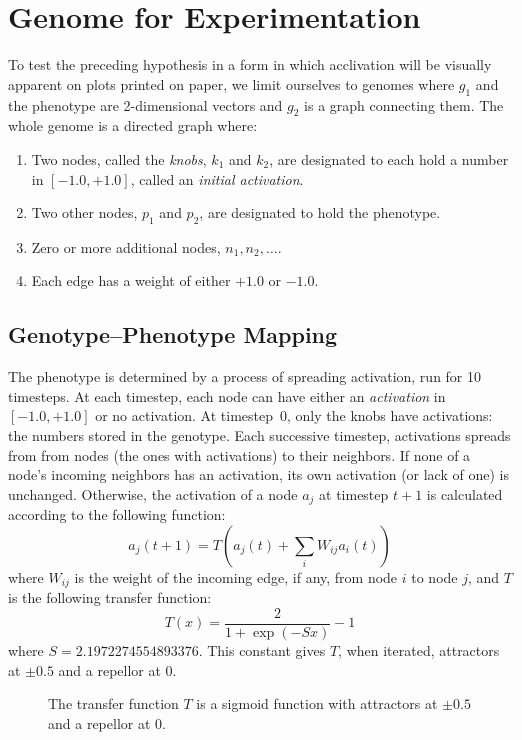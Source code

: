 \documentclass[letterpaper]{article}
\begin{document}
\section{Genome for Experimentation}

To test the preceding hypothesis in a form in which acclivation will be
visually apparent on plots printed on paper, we limit ourselves to genomes
where $g_1$ and the phenotype are 2-dimensional vectors and $g_2$ is a graph
connecting them.  The whole genome is a directed graph where:
\begin{enumerate}
   \item Two nodes, called the \textit{knobs}, $k_1$ and $k_2$, are designated
      to each hold a number in $[-1.0, +1.0]$, called an \textit{initial
      activation}.
   \item Two other nodes, $p_1$ and $p_2$, are designated to hold the
      phenotype.
   \item Zero or more additional nodes, $n_1, n_2, \ldots$.
   \item Each edge has a weight of either $+1.0$ or $-1.0$.
\end{enumerate}

\subsection{Genotype--Phenotype Mapping}

The phenotype is determined by a process of spreading activation, run for
10 timesteps. At each timestep, each node can have either an
\textit{activation} in $[-1.0,+1.0]$ or no activation. At timestep~0, only the
knobs have activations: the numbers stored in the genotype. Each successive
timestep, activations spreads from from nodes (the ones with activations) to
their neighbors. If none of a node's incoming neighbors has an activation, its
own activation (or lack of one) is unchanged. Otherwise, the activation of a
node $a_j$ at timestep $t+1$ is calculated according to the following
function:
\[
   a_j(t+1) = T(a_j(t) + \sum_iW_{ij}a_i(t))
\]
where $W_{ij}$ is the weight of the incoming edge, if any, from node $i$ to
node $j$, and $T$ is the following transfer function:
\[
   T(x) = \frac{2}{1+\exp(-Sx)}-1
\]
where $S=2.1972274554893376$. This constant gives $T$, when iterated,
attractors at $\pm0.5$ and a repellor at 0.

\begin{figure}
\centering
{}
\caption{The transfer function $T$ is a sigmoid function with attractors at
$\pm0.5$ and a repellor at $0$.}
\end{figure}
\end{document}
